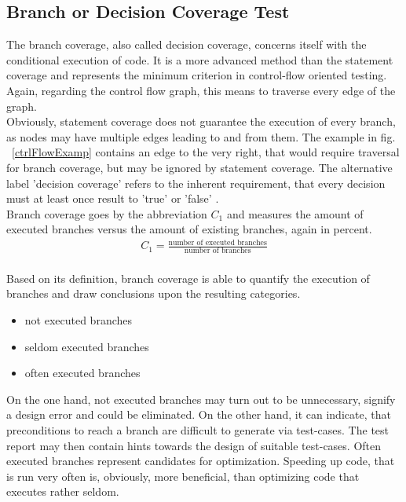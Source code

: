	\subsection{Branch or Decision Coverage Test}
	The branch coverage, also called decision coverage, concerns itself with the conditional execution of code. It is a more advanced method than the statement coverage and represents the minimum criterion in control-flow oriented testing. Again, regarding the control flow graph, this means to traverse every edge of the graph. \\ Obviously, statement coverage does not guarantee the execution of every branch, as nodes may have multiple edges leading to and from them. The example in fig. ~\ref{ctrlFlowExamp} contains an edge to the very right, that would require traversal for branch coverage, but may be ignored by statement coverage. The alternative label 'decision coverage' refers to the inherent requirement, that every decision must at least once result to 'true' or 'false' \cite{Tai1980ProgramTC}. \\
	Branch coverage goes by the abbreviation $C_1$ and measures the amount of executed branches versus the amount of existing branches, again in percent.
		\begin{align*}
		C_1 = \frac{\textrm{number of executed branches}}{\textrm{number of branches}}
		\end{align*} \\
	Based on its definition, branch coverage is able to quantify the execution of branches and draw conclusions upon the resulting categories. \\
	\begin{itemize} \setlength\itemsep{1px}
	\item not executed branches
	\item seldom executed branches
	\item often executed branches \\
	\end{itemize} 

	On the one hand, not executed branches may turn out to be unnecessary, signify a design error and could be eliminated. On the other hand, it can indicate, that preconditions to reach a branch are difficult to generate via test-cases. The test report may then contain hints towards the design of suitable test-cases. Often executed branches represent candidates for optimization. Speeding up code, that is run very often is, obviously, more beneficial, than optimizing code that executes rather seldom. \\

